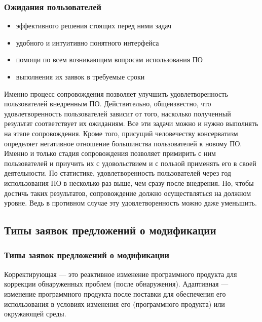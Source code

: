 \documentclass{../industrial-development}
\begin{document}
\lecturenotes


\begin{frame} \frametitle{Ожидания пользователей}
	\begin{itemize}
		\item эффективного решения стоящих перед ними задач 
		\item удобного и интуитивно понятного интерфейса 
		\item помощи по всем возникающим вопросам использования ПО 
		\item выполнения их заявок в требуемые сроки 
	\end{itemize}
\end{frame}

\lecturenotes
Именно процесс сопровождения позволяет улучшить удовлетворенность пользователей внедренным ПО. Действительно, общеизвестно, что удовлетворенность пользователей зависит от того, насколько полученный результат соответствует их ожиданиям. 
Все эти задачи можно и нужно выполнять на этапе сопровождения. Кроме того, присущий человечеству консерватизм определяет негативное отношение большинства пользователей к новому ПО. Именно и только стадия сопровождения позволяет примирить с ним пользователей и приучить их с удовольствием и с пользой применять его в своей деятельности. По статистике, удовлетворенность пользователей через год использования ПО в несколько раз выше, чем сразу после внедрения. 
Но, чтобы достичь таких результатов, сопровождение должно осуществляться на должном уровне. Ведь в противном случае эту удовлетворенность можно даже уменьшить. 


\subsection{Типы заявок предложений о модификации}
\begin{frame} \frametitle{Типы заявок предложений о модификации}
	\begin{itemize}
		\alert{Корректирующая} --- это реактивное изменение программного продукта для коррекции обнаруженных проблем (после обнаружения).\newline
		\alert{Адаптивная} --- изменение программного продукта после поставки для обеспечения его использования в условиях изменения его (программного продукта) или окружающей среды. 
	\end{itemize}
\end{frame}
\end{document}
